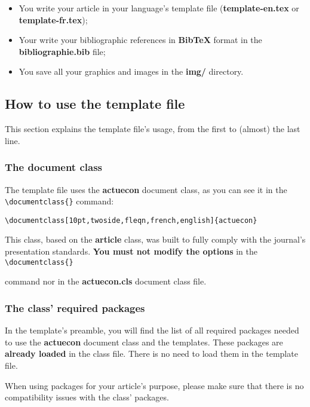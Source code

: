 \documentclass[english]{article}
\newcommand{\cmd}[1]{%
	\texttt{\textbackslash#1\{\}}
}
\begin{document}
			\begin{itemize}
				\item You write your article in your language's template file 
					(\textbf{template-en.tex} or \textbf{template-fr.tex});
				\item Your write your bibliographic references in \textbf{Bib\TeX} format in the
					\textbf{bibliographie.bib} file;
				\item You save all your graphics and images in the \textbf{img/} directory.
			\end{itemize}
	
		\subsection{How to use the template file}
		
			This section explains the template file's usage, from the first to (almost) the last line.
			
			\subsubsection{The document class}
			
				The template file uses the \textbf{actuecon} document class, as you can see it in the
				\cmd{documentclass} command:
				
				\begin{shaded*}
					\verb|\documentclass[10pt,twoside,fleqn,french,english]{actuecon}|
				\end{shaded*}
			
				This class, based on the \textbf{article} class, was built to fully comply with the journal's
				presentation standards. \textbf{You must not modify the options} in the \cmd{documentclass}
				command nor in the \textbf{actuecon.cls} document class file.
				
			\subsubsection{The class' required packages}
			
				In the template's preamble, you will find the list of all required packages needed to use
				the \textbf{actuecon} document class and the templates. These packages are
				\textbf{already loaded} in the class file. There is no need to load them in the template file.
				
				When using packages for your article's purpose, please make sure that there is no
				compatibility issues with the class' packages.
				
\end{document}
